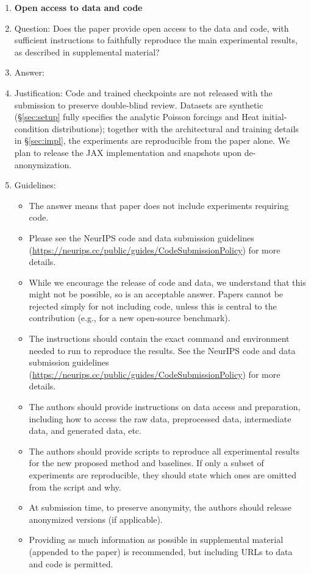 \begin{enumerate}
\item {\bf Open access to data and code}
    \item[] Question: Does the paper provide open access to the data and code, with sufficient instructions to faithfully reproduce the main experimental results, as described in supplemental material?
    \item[] Answer: \answerNo{}
    \item[] Justification: Code and trained checkpoints are not released with the submission to preserve double-blind review. Datasets are synthetic (\S\ref{sec:setup} fully specifies the analytic Poisson forcings and Heat initial-condition distributions); together with the architectural and training details in \S\ref{sec:impl}, the experiments are reproducible from the paper alone. We plan to release the JAX implementation and snapshots upon de-anonymization.
    \item[] Guidelines:
    \begin{itemize}
        \item The answer \answerNA{} means that paper does not include experiments requiring code.
        \item Please see the NeurIPS code and data submission guidelines (\url{https://neurips.cc/public/guides/CodeSubmissionPolicy}) for more details.
        \item While we encourage the release of code and data, we understand that this might not be possible, so \answerNo{} is an acceptable answer. Papers cannot be rejected simply for not including code, unless this is central to the contribution (e.g., for a new open-source benchmark).
        \item The instructions should contain the exact command and environment needed to run to reproduce the results. See the NeurIPS code and data submission guidelines (\url{https://neurips.cc/public/guides/CodeSubmissionPolicy}) for more details.
        \item The authors should provide instructions on data access and preparation, including how to access the raw data, preprocessed data, intermediate data, and generated data, etc.
        \item The authors should provide scripts to reproduce all experimental results for the new proposed method and baselines. If only a subset of experiments are reproducible, they should state which ones are omitted from the script and why.
        \item At submission time, to preserve anonymity, the authors should release anonymized versions (if applicable).
        \item Providing as much information as possible in supplemental material (appended to the paper) is recommended, but including URLs to data and code is permitted.
    \end{itemize}



\end{enumerate}
